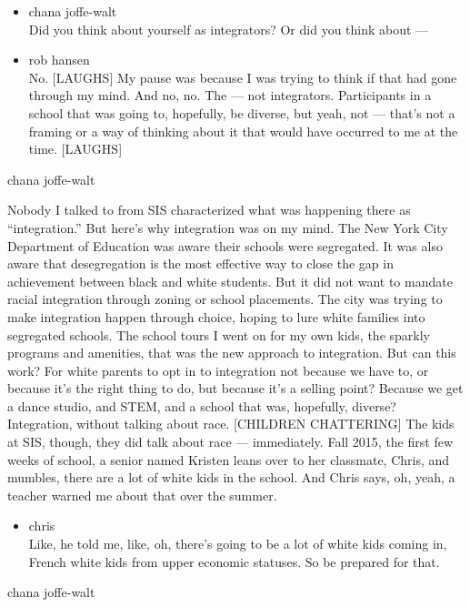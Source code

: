 \begin{itemize}
\item
  chana joffe-walt\\
  Did you think about yourself as integrators? Or did you think about
  ---
\item
  rob hansen\\
  No. {[}LAUGHS{]} My pause was because I was trying to think if that
  had gone through my mind. And no, no. The --- not integrators.
  Participants in a school that was going to, hopefully, be diverse, but
  yeah, not --- that's not a framing or a way of thinking about it that
  would have occurred to me at the time. {[}LAUGHS{]}
\end{itemize}

chana joffe-walt

Nobody I talked to from SIS characterized what was happening there as
``integration.'' But here's why integration was on my mind. The New York
City Department of Education was aware their schools were segregated. It
was also aware that desegregation is the most effective way to close the
gap in achievement between black and white students. But it did not want
to mandate racial integration through zoning or school placements. The
city was trying to make integration happen through choice, hoping to
lure white families into segregated schools. The school tours I went on
for my own kids, the sparkly programs and amenities, that was the new
approach to integration. But can this work? For white parents to opt in
to integration not because we have to, or because it's the right thing
to do, but because it's a selling point? Because we get a dance studio,
and STEM, and a school that was, hopefully, diverse? Integration,
without talking about race. {[}CHILDREN CHATTERING{]} The kids at SIS,
though, they did talk about race --- immediately. Fall 2015, the first
few weeks of school, a senior named Kristen leans over to her classmate,
Chris, and mumbles, there are a lot of white kids in the school. And
Chris says, oh, yeah, a teacher warned me about that over the summer.

\begin{itemize}
\tightlist
\item
  chris\\
  Like, he told me, like, oh, there's going to be a lot of white kids
  coming in, French white kids from upper economic statuses. So be
  prepared for that.
\end{itemize}

chana joffe-walt

